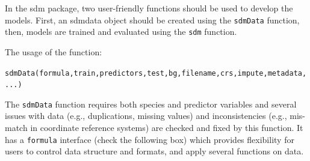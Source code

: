 \documentclass[
]{article}
\begin{document}
In the sdm package, two user-friendly functions should be used to
develop the models. First, an sdmdata object should be created using the
\texttt{sdmData} function, then, models are trained and evaluated using
the \texttt{sdm} function.

The usage of the function:

\texttt{sdmData(formula,train,predictors,test,bg,filename,crs,impute,metadata,...)}

The \texttt{sdmData} function requires both species and predictor
variables and several issues with data (e.g., duplications, missing
values) and inconsistencies (e.g., mis-match in coordinate reference
systems) are checked and fixed by this function. It has a
\texttt{formula} interface (check the following box) which provides
flexibility for users to control data structure and formats, and apply
several functions on data.
\end{document}
